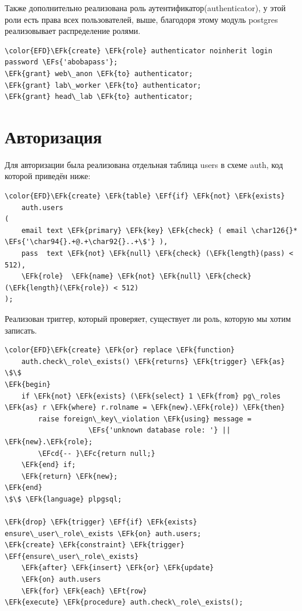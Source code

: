 \documentclass[14pt]{extarticle}
\newcommand{\EFc}[1]{\textcolor{EFc}{#1}} %
\newcommand{\EFcd}[1]{\textcolor{EFcd}{#1}} %
\newcommand{\EFs}[1]{\textcolor{EFs}{#1}} %
\newcommand{\EFk}[1]{\textcolor{EFk}{#1}} %
\newcommand{\EFf}[1]{\textcolor{EFf}{#1}} %
\newcommand{\EFt}[1]{\textcolor{EFt}{#1}} %
\begin{document}
Также дополнительно реализована роль аутентификатор(authenticator),
у этой роли есть права всех пользователей, выше, благодоря этому
модуль postgres реализовывает распределение ролями.

\begin{Code}
\begin{Verbatim}
\color{EFD}\EFk{create} \EFk{role} authenticator noinherit login password \EFs{'abobapass'};
\EFk{grant} web\_anon \EFk{to} authenticator;
\EFk{grant} lab\_worker \EFk{to} authenticator;
\EFk{grant} head\_lab \EFk{to} authenticator;
\end{Verbatim}
\end{Code}

\section{Авторизация}
\label{sec:org3d4b7e5}

Для авторизации была реализована отдельная таблица users в схеме auth,
код которой приведён ниже:

\begin{Code}
\begin{Verbatim}
\color{EFD}\EFk{create} \EFk{table} \EFf{if} \EFk{not} \EFk{exists}
    auth.users
(
    email text \EFk{primary} \EFk{key} \EFk{check} ( email \char126{}* \EFs{'\char94{}.+@.+\char92{}..+\$'} ),
    pass  text \EFk{not} \EFk{null} \EFk{check} (\EFk{length}(pass) < 512),
    \EFk{role}  \EFk{name} \EFk{not} \EFk{null} \EFk{check} (\EFk{length}(\EFk{role}) < 512)
);
\end{Verbatim}
\end{Code}

Реализован триггер, который проверяет,
существует ли роль, которую мы хотим записать.


\begin{Code}
\begin{Verbatim}
\color{EFD}\EFk{create} \EFk{or} replace \EFk{function}
    auth.check\_role\_exists() \EFk{returns} \EFk{trigger} \EFk{as}
\$\$
\EFk{begin}
    if \EFk{not} \EFk{exists} (\EFk{select} 1 \EFk{from} pg\_roles \EFk{as} r \EFk{where} r.rolname = \EFk{new}.\EFk{role}) \EFk{then}
        raise foreign\_key\_violation \EFk{using} message =
                    \EFs{'unknown database role: '} || \EFk{new}.\EFk{role};
        \EFcd{-- }\EFc{return null;}
    \EFk{end} if;
    \EFk{return} \EFk{new};
\EFk{end}
\$\$ \EFk{language} plpgsql;

\EFk{drop} \EFk{trigger} \EFf{if} \EFk{exists} ensure\_user\_role\_exists \EFk{on} auth.users;
\EFk{create} \EFk{constraint} \EFk{trigger} \EFf{ensure\_user\_role\_exists}
    \EFk{after} \EFk{insert} \EFk{or} \EFk{update}
    \EFk{on} auth.users
    \EFk{for} \EFk{each} \EFt{row}
\EFk{execute} \EFk{procedure} auth.check\_role\_exists();
\end{Verbatim}
\end{Code}
\end{document}

